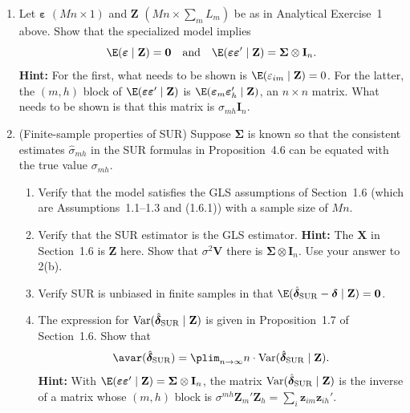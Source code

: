 \begin{problemset}
\begin{enumerate}[label=(\alph*)]
\item Let $\boldsymbol{\varepsilon}$ $(Mn \times 1)$ and $\mathbf{Z}$
$(Mn \times \sum_m L_m)$ be as in Analytical Exercise~1 above.
Show that the specialized model implies
\[
\E(\boldsymbol{\varepsilon} \mid \mathbf{Z}) = \mathbf{0}
\quad \text{and} \quad
\E(\boldsymbol{\varepsilon}\boldsymbol{\varepsilon}' \mid \mathbf{Z})
= \boldsymbol{\Sigma} \otimes \mathbf{I}_n.
\]
\textbf{Hint:} For the first, what needs to be shown is
$\E(\varepsilon_{im} \mid \mathbf{Z}) = 0$. For the latter, the $(m, h)$ block of
$\E(\boldsymbol{\varepsilon}\boldsymbol{\varepsilon}' \mid \mathbf{Z})$ is
$\E(\boldsymbol{\varepsilon}_m \boldsymbol{\varepsilon}_h' \mid \mathbf{Z})$,
an $n \times n$ matrix. What needs to be shown is that this matrix is
$\sigma_{mh} \mathbf{I}_n$.

\item (Finite-sample properties of SUR)\quad
Suppose $\boldsymbol{\Sigma}$ is known so that the consistent estimates
$\hat{\sigma}_{mh}$ in the SUR formulas in Proposition~4.6 can be equated with
the true value $\sigma_{mh}$.
\begin{enumerate}[label=(\roman*)]
\item Verify that the model satisfies the GLS assumptions of Section~1.6
(which are Assumptions~1.1--1.3 and (1.6.1)) with a sample size of $Mn$.
\item Verify that the SUR estimator is the GLS estimator.
\textbf{Hint:} The $\mathbf{X}$ in Section~1.6 is $\mathbf{Z}$ here.
Show that $\sigma^2 \mathbf{V}$ there is $\boldsymbol{\Sigma} \otimes \mathbf{I}_n$.
Use your answer to 2(b).
\item Verify SUR is unbiased in finite samples in that
$\E(\hat{\boldsymbol{\delta}}_{\mathrm{SUR}} - \boldsymbol{\delta} \mid \mathbf{Z})
= \mathbf{0}$.
\item The expression for $\operatorname{Var}(\hat{\boldsymbol{\delta}}_{\mathrm{SUR}} \mid \mathbf{Z})$
is given in Proposition~1.7 of Section~1.6. Show that
\[
\avar(\hat{\boldsymbol{\delta}}_{\mathrm{SUR}})
= \plim_{n \to \infty} n \cdot
\Var(\hat{\boldsymbol{\delta}}_{\mathrm{SUR}} \mid \mathbf{Z}).
\]
\textbf{Hint:} With $\E(\boldsymbol{\varepsilon}\boldsymbol{\varepsilon}' \mid \mathbf{Z})
= \boldsymbol{\Sigma} \otimes \mathbf{I}_n$, the matrix
$\operatorname{Var}(\hat{\boldsymbol{\delta}}_{\mathrm{SUR}} \mid \mathbf{Z})$ is the inverse of a
matrix whose $(m,h)$ block is
$\sigma^{mh} \mathbf{Z}_m' \mathbf{Z}_h
= \sum_i \mathbf{z}_{im} \mathbf{z}_{ih}'$.
\end{enumerate}


\end{enumerate}
\end{problemset}
